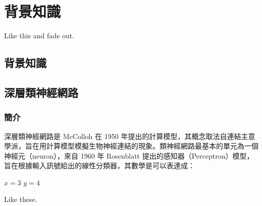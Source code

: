 \chapter{背景知識}
Like this \cite{726791, baevski2020wav2vec} and fade out.

\section{背景知識}

\section{深層類神經網路}

\subsection{簡介}

深層類神經網路是 McColloh 在 1950 年提出的計算模型，其概念取法自連結主意學派，旨在用計算模型模擬生物神經連結的現象。類神經網路最基本的單元為一個神經元（neuron），來自 1960 年 Rosenblatt 提出的感知器（Perceptron）模型，旨在根據輸入訊號給出的線性分類器，其數學是可以表達成：

$ x = 3 $
\( y = 4 \)

Like these.

